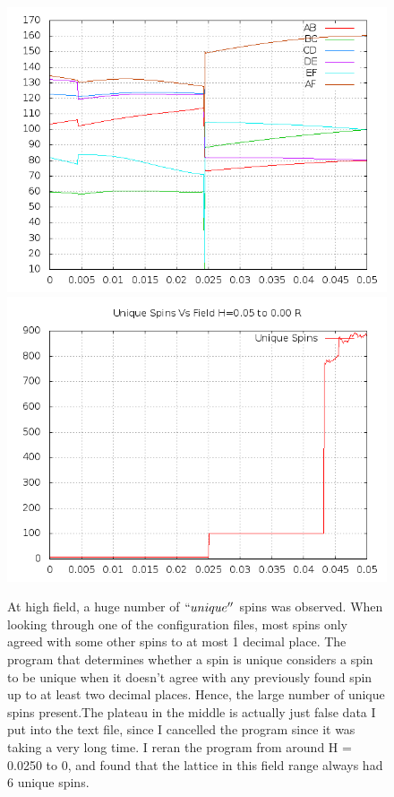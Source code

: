 \documentclass{article}
\begin{document}
\begin{figure}
\centering
\includegraphics[scale=0.5]{005to000Rdots.png}
\includegraphics[scale=0.5]{005to000RFreq.png}
\caption{At high field, a huge number of $``unique''$ spins was observed. When looking through one of the configuration
files, most spins only agreed with some other spins to at most 1 decimal place. The program that determines whether
a spin is unique considers a spin to be unique when it doesn't agree with any previously found spin up to at least two decimal 
places. Hence, the large number of unique spins present.The plateau in the middle is actually just false data I put
into the text file, since I cancelled the program since it was taking a very long time. I reran the program from around
H = 0.0250 to 0, and found that the lattice in this field range always had 6 unique spins.}
\end{figure}
\end{document}
